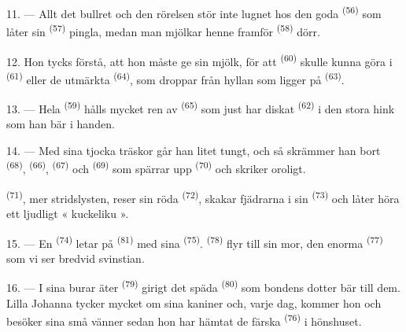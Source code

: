 11. --- Allt det bullret och den rörelsen stör inte lugnet hos den goda
 \textsuperscript{(56)} som låter sin 
\textsuperscript{(57)} pingla, medan man mjölkar henne framför 
\textsuperscript{(58)} dörr.

12. Hon tycks förstå, att hon måste ge sin mjölk, för att 
\textsuperscript{(60)} skulle kunna göra  i 
\textsuperscript{(61)} eller de utmärkta  \textsuperscript{(64)}, som droppar
från hyllan som ligger på  \textsuperscript{(63)}.

13. --- Hela  \textsuperscript{(59)} hålls mycket ren av
 \textsuperscript{(65)} som just har diskat
 \textsuperscript{(62)} i den stora hink som han bär i
handen.

\VUsaut{3.0mm}
\VUsaut{3.0mm}

14. --- Med sina tjocka träskor går han litet tungt, och så skrämmer han bort
 \textsuperscript{(68)}, 
\textsuperscript{(66)},  \textsuperscript{(67)} och
 \textsuperscript{(69)} som spärrar upp 
\textsuperscript{(70)} och skriker oroligt.

 \textsuperscript{(71)}, mer stridslysten, reser sin röda
 \textsuperscript{(72)}, skakar fjädrarna i sin 
\textsuperscript{(73)} och låter höra ett ljudligt « kuckeliku ».

15. --- En  \textsuperscript{(74)} letar på
 \textsuperscript{(81)} med sina 
\textsuperscript{(75)}.  \textsuperscript{(78)} flyr till sin mor, den enorma
 \textsuperscript{(77)} som vi ser bredvid svinstian.

16. --- I sina burar äter  \textsuperscript{(79)} girigt det späda
 \textsuperscript{(80)} som bondens dotter bär till dem. Lilla Johanna tycker
mycket om sina kaniner och, varje dag, kommer hon och besöker sina små vänner sedan hon har
hämtat de färska  \textsuperscript{(76)} i hönshuset.
\VUsaut{6.0mm}
\VUfilet{22mm}
